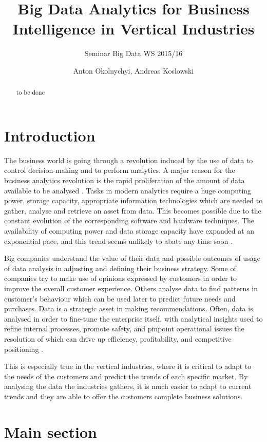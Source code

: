 \documentclass[runningheads]{llncs}
\title{Big Data Analytics for Business Intelligence in Vertical Industries}
\subtitle{Seminar Big Data WS 2015/16}
\author{Anton Okolnychyi, Andreas Koslowski}
\institute{RWTH Aachen University, 52056 Aachen, Germany\\
\{anton.okolnychyi, andreas.koslowski\}@rwth-aachen.de}
\begin{document}
\maketitle

\begin{abstract}
to be done
\end{abstract}

\section{Introduction}
The business world is going through a revolution induced by the use of data to control decision-making and to perform analytics. A major reason for the business analytics revolution is the rapid proliferation of the amount of data available to be analysed \cite{Gopalkrishnan}. Tasks in modern analytics require a huge computing power, storage capacity, appropriate information technologies which are needed to gather, analyse and retrieve an asset from data. This becomes possible due to the constant evolution of the corresponding software and hardware techniques. The availability of computing power and data storage capacity have expanded at an exponential pace, and this trend seems unlikely to abate any time soon \cite{NYTIMES}.  

Big companies understand the value of their data and possible outcomes of usage of data analysis in adjusting and defining their business strategy.  Some of companies try to make use of opinions expressed by customers in order to improve the overall customer experience. Others analyse data to find patterns in customer's behaviour which can be used later to predict future needs and purchases. Data is a strategic asset in making recommendations. Often, data is analysed in order to fine-tune the enterprise itself, with analytical insights used to refine internal processes, promote safety, and pinpoint operational issues the resolution of which can drive up efficiency, profitability, and competitive positioning \cite{Guszcza}.

This is especially true in the vertical industries, where it is critical to adapt to the needs of the customers and predict the trends of each specific market. By analysing the data the industries gathers, it is much easier to adapt to current trends and they are able to offer the customers complete business solutions.

\section{Main section}
\end{document}
